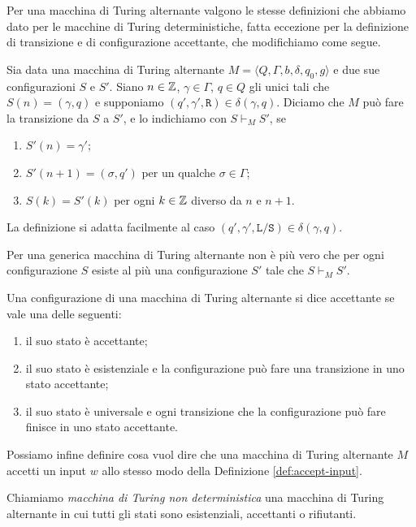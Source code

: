 Per una macchina di Turing alternante valgono le stesse definizioni che
abbiamo dato per le macchine di Turing deterministiche, 
fatta eccezione per la definizione di transizione e di configurazione accettante, che
modifichiamo come segue.
\begin{definizione}
 Sia data una macchina di Turing alternante $M=\langle Q, \Gamma, b, \delta, q_0, g \rangle$
 e due sue configurazioni $S$ e $S'$.
 Siano $n \in \mathbb{Z}$, $\gamma \in \Gamma$, $q \in Q$ gli unici tali che
 $S(n) = (\gamma, q)$ e supponiamo $(q', \gamma', \texttt{R}) \in \delta(\gamma, q)$.
 Diciamo che  $M$ può fare la transizione da $S$ a $S'$, e lo indichiamo con
 $S \vdash_M S'$, se 
 \begin{enumerate}
  \item $S'(n)=\gamma'$;
  \item $S'(n+1)=(\sigma, q')$ per un
 qualche $\sigma \in \Gamma$;
  \item $S(k) = S'(k)$ per ogni $k \in \mathbb{Z}$ diverso da
 $n$ e $n+1$.
 \end{enumerate}
 La definizione si adatta facilmente al caso
 $(q', \gamma', \texttt{L}/\texttt{S}) \in \delta(\gamma, q)$.
\end{definizione}

\begin{osservazione}
 Per una generica macchina di Turing alternante non è più vero che per ogni
 configurazione $S$ esiste al più una configurazione $S'$ tale che $S \vdash_M S'$.
\end{osservazione}

\begin{definizione}
 Una configurazione di una macchina di Turing alternante si dice accettante se
 vale una delle seguenti:
 \begin{enumerate}
  \item il suo stato è accettante;
  \item il suo stato è esistenziale e la configurazione può fare una transizione
  in uno stato accettante;
  \item il suo stato è universale e ogni transizione che la configurazione può fare
  finisce in uno stato accettante.
 \end{enumerate}
\end{definizione}
Possiamo infine definire cosa vuol dire che una macchina di Turing alternante
$M$ accetti un input $w$ allo stesso modo della Definizione \ref{def:accept-input}.

\begin{definizione}
 Chiamiamo \emph{macchina di Turing non deterministica} una macchina di Turing
 alternante in cui tutti gli stati sono esistenziali, accettanti o rifiutanti.
\end{definizione}

